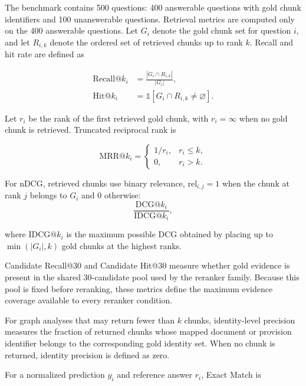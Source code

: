 The benchmark contains 500 questions: 400 answerable questions with gold chunk identifiers
and 100 unanswerable questions. Retrieval metrics are computed only on the 400 answerable questions.
Let $G_i$ denote the gold chunk set for question $i$, and let $R_{i,k}$ denote the ordered set of retrieved chunks up to rank $k$.
Recall and hit rate are defined as

\begin{equation}
\begin{aligned}
\mathrm{Recall@}k_i
&=
\frac{|G_i \cap R_{i,k}|}{|G_i|},\\
\mathrm{Hit@}k_i
&=
\mathbb{1}[G_i \cap R_{i,k} \neq \varnothing].
\end{aligned}
\end{equation}

Let $r_i$ be the rank of the first retrieved gold chunk, with $r_i=\infty$
when no gold chunk is retrieved. Truncated reciprocal rank is

\begin{equation}
\mathrm{MRR@}k_i =
\begin{cases}
1/r_i, & r_i \leq k,\\
0, & r_i > k.
\end{cases}
\end{equation}

For nDCG, retrieved chunks use binary relevance,
$\mathrm{rel}_{i,j}=1$ when the chunk at rank $j$ belongs to $G_i$ and $0$ otherwise:
\begin{equation}
\frac{\mathrm{DCG@}k_i}{\mathrm{IDCG@}k_i},
\end{equation}

where $\mathrm{IDCG@}k_i$ is the maximum possible DCG obtained by placing up to $\min(|G_i|,k)$ gold chunks at the highest ranks.

Candidate Recall@30 and Candidate Hit@30 measure whether gold evidence is present in the shared 30-candidate pool used by the reranker family. Because this pool is fixed before reranking, these metrics define the maximum evidence coverage available to every reranker condition.

For graph analyses that may return fewer than $k$ chunks, identity-level precision measures the fraction of returned chunks whose mapped document or provision identifier belongs to the corresponding gold identity set. When no chunk is returned, identity precision is defined as zero.

For a normalized prediction $y_i$ and reference answer $r_i$, Exact Match is

